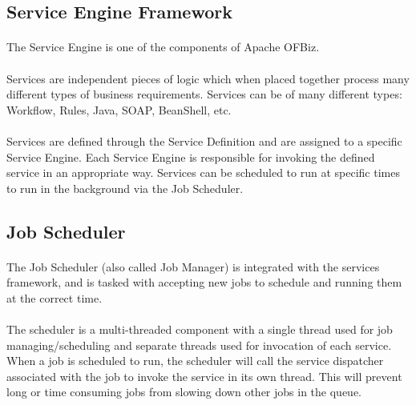 \documentclass[english]{article}
\begin{document}
\subsection{Service Engine Framework}
\paragraph{}
The Service Engine is one of the components of Apache OFBiz.

\paragraph{}
Services are independent pieces of logic which when placed together process many different types of business requirements. Services can be of many different types: Workflow, Rules, Java, SOAP, BeanShell, etc.

\paragraph{}
Services are defined through the Service Definition and are assigned to a specific Service Engine. Each Service Engine is responsible for invoking the defined service in an appropriate way. Services can be scheduled to run at specific times to run in the background via the Job Scheduler.

\subsection{Job Scheduler}

\paragraph{}
The Job Scheduler (also called Job Manager) is integrated with the services framework, and is tasked with accepting new jobs to schedule and running them at the correct time.

\paragraph{}
The scheduler is a multi-threaded component with a single thread used for job managing/scheduling and separate threads used for invocation of each service. When a job is scheduled to run, the scheduler will call the service dispatcher associated with the job to invoke the service in its own thread. This will prevent long or time consuming jobs from slowing down other jobs in the queue.
\end{document}
